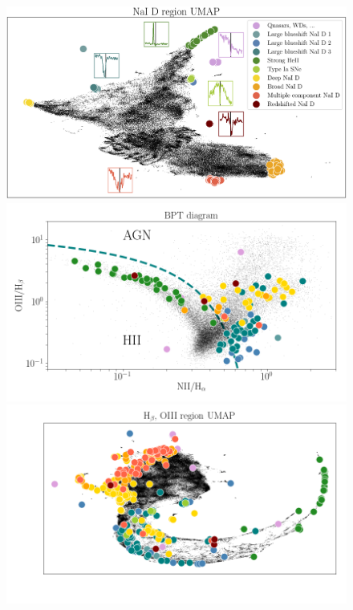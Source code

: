 \documentclass[fleqn,usenatbib]{mnras}
\begin{document}
{\begin{figure}
\includegraphics[width=\textwidth]{v102.png}  \\[6pt]
\includegraphics[width=\columnwidth]{bpt_no_leg.png}   \includegraphics[width=\columnwidth]{hb_oiii_umap_no_leg.png} 



\end{figure}}
\end{document}
